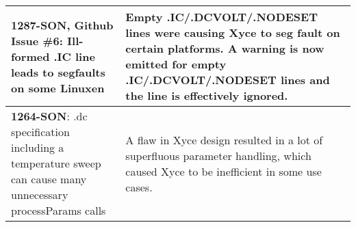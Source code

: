 {\begin{longtable}[h] {>{\raggedright\small}m{2in}|>{\raggedright\let\\\tabularnewline\small}m{3.5in}}
\textbf{1287-SON, Github Issue \#6}: Ill-formed .IC line leads to segfaults on some Linuxen
& Empty .IC/.DCVOLT/.NODESET lines were causing Xyce to seg fault on certain platforms.
A warning is now emitted for empty .IC/.DCVOLT/.NODESET lines and the line is effectively ignored.
\\ \hline

\textbf{1264-SON}: .dc specification including a temperature sweep can cause many unnecessary processParams calls
&  A flaw in Xyce design resulted in a lot of superfluous parameter handling, which caused Xyce to be inefficient in some use cases.
\\ \hline


\end{longtable}
}
